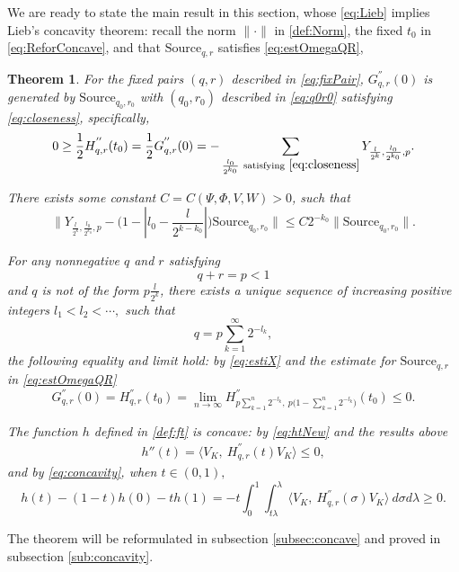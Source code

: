 \documentclass{article}
\numberwithin{equation}{section}
\newtheorem{theorem}{Theorem}[section]
\begin{document}
We are ready to state the main result in this section, whose \eqref{eq:Lieb} implies Lieb's concavity theorem: recall the norm $\|\cdot \|$ in \eqref{def:Norm}, the fixed $t_0$ in \eqref{eq:ReforConcave}, and that $\text{Source}_{q,r}$ satisfies \eqref{eq:estOmegaQR},
\begin{theorem}\label{MainTheorem:concavity}
 For the fixed pairs $(q,r)$ described in \eqref{eq:fixPair}, $G^{''}_{q,r}(0)$ is generated by $\text{Source}_{q_0,r_0}$ with $(q_0,r_0)$ described in \eqref{eq:q0r0} satisfying \eqref{eq:closeness}, specifically,   
\begin{equation}\label{eq:expreFPrime}
0\geq\frac{1}{2}H^{''}_{q,r}(t_0)= \frac{1}{2}G^{''}_{q,r} (0)= -\sum_{\frac{l_0}{2^{k_0}}\ \text{satisfying} \ \eqref{eq:closeness}
} Y_{  \frac{l}{2^k},  \frac{l_0}{2^{k_0}}, p }.
\end{equation}


There exists some constant $C=C(\Psi,\Phi, V, W)>0$, such that
\begin{equation}\label{eq:estiX}
\Big\|  Y_{\frac{l}{2^k}, \frac{l_0}{2^{k_0}}, p }-\big(1-|l_0-\frac{l}{2^{k-k_0}}|\big) \text{Source}_{q_0,r_0}\Big\|\leq C 2^{-k_0} \Big\|\text{Source}_{q_0,r_0}\Big\|.
\end{equation} 

For any nonnegative $q$ and $r$ satisfying $$q+r=p<1$$ and $q$ is not of the form $p\frac{l}{2^{k}}$, there exists a unique sequence of increasing positive integers $l_1<l_2<\cdots,$ such that
$$q=p\sum_{k=1}^{\infty}2^{-l_k},$$
the following equality and limit hold: by \eqref{eq:estiX} and the estimate for $\text{Source}_{q,r}$ in \eqref{eq:estOmegaQR}
\begin{equation}\label{eq:limitDeri}
  G^{''}_{q,r}(0)=H^{''}_{q,r}(t_0)=\lim_{n\rightarrow \infty}H^{''}_{p\sum_{k=1}^{n} 2^{-l_k}, \ p\big(1-\sum_{k=1}^{n} 2^{-l_k}\big)}(t_0)\leq 0.
\end{equation} 

The function $h$ defined in \eqref{def:ft} is concave: by \eqref{eq:htNew} and the results above
\begin{align}
  h''(t)=\big\langle V_K,\ H_{q,r}^{''}(t) V_{K}\big\rangle\leq 0,
\end{align} and by \eqref{eq:concavity}, when $t\in (0,1),$
\begin{equation}\label{eq:Lieb}
  h(t)-(1-t)h(0)-t h(1)=-t\int_{0}^{1}\int_{t\lambda}^{\lambda} \big\langle V_K,\ H_{q,r}^{''}(\sigma) V_{K}\big\rangle\ d\sigma d\lambda\geq 0.
\end{equation}
\end{theorem}
The theorem will be reformulated in subsection \ref{subsec:concave} and proved in subsection \ref{sub:concavity}.
\end{document}
